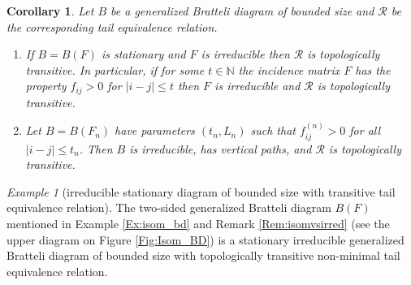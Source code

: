\documentclass[11pt, twoside]{amsart}
\theoremstyle{definition}
\theoremstyle{remark}
\newtheorem{example}[definition]{Example}
\theoremstyle{plain}
\newtheorem{corol}[definition]{Corollary}
\newcommand{\N}{\mathbb N}
\numberwithin{equation}{section}
\begin{document}
\begin{corol}
Let $B$ be a generalized Bratteli diagram of bounded size and $\mathcal{R}$ be the corresponding tail equivalence relation.

\begin{enumerate}[label=\upshape(\roman*), leftmargin=*, widest=iii]

\item If $B = B(F)$ is stationary and $F$ is irreducible then $\mathcal{R}$ is topologically transitive. In particular, if for some $t \in \N$ the incidence matrix $F$ has the property $f_{ij} > 0$ for $|i-j| \leq t$ then $F$ is irreducible and $\mathcal{R}$ is topologically transitive.

\item Let $B = B(F_n)$ have parameters $(t_n, L_n)$ such that
$f_{ij}^{(n)} > 0$ for all $|i - j| \leq t_n$. Then $B$ is irreducible, has vertical paths, and $\mathcal{R}$ is topologically transitive.
\end{enumerate}
\end{corol}


\begin{example}[irreducible stationary diagram of bounded size with transitive tail equivalence relation]
The two-sided generalized Bratteli diagram $B(F)$ mentioned in Example \ref{Ex:isom_bd} and Remark \ref{Rem:isomvsirred} (see the upper diagram on Figure \ref{Fig:Isom_BD}) is a stationary irreducible generalized Bratteli diagram of bounded size with topologically transitive non-minimal tail equivalence relation. 
\end{example}
\end{document}
